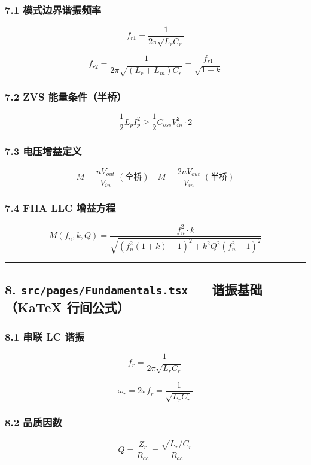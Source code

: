 \documentclass[UTF8]{ctexart}
\begin{document}
\subsubsection*{7.1 模式边界谐振频率}

\[
f_{r1} = \frac{1}{2\pi\sqrt{L_r C_r}}
\]

\[
f_{r2} = \frac{1}{2\pi\sqrt{(L_r + L_m) C_r}} = \frac{f_{r1}}{\sqrt{1 + k}}
\]

\subsubsection*{7.2 ZVS 能量条件（半桥）}

\[
\frac{1}{2} L_p I_p^2 \geq \frac{1}{2} C_{oss} V_{in}^2 \cdot 2
\]

\subsubsection*{7.3 电压增益定义}

\[
M = \frac{n V_{out}}{V_{in}} \;(\text{全桥}) \quad M = \frac{2n V_{out}}{V_{in}} \;(\text{半桥})
\]

\subsubsection*{7.4 FHA LLC 增益方程}

\[
M(f_n, k, Q) = \frac{f_n^2 \cdot k}{\sqrt{(f_n^2(1+k)-1)^2 + k^2 Q^2 (f_n^2-1)^2}}
\]

\noindent\rule{\textwidth}{0.4pt}

\subsection*{8. \texttt{src/pages/Fundamentals.tsx} — 谐振基础（KaTeX 行间公式）}

\subsubsection*{8.1 串联 LC 谐振}

\[
f_r = \frac{1}{2\pi\sqrt{L_r C_r}}
\]

\[
\omega_r = 2\pi f_r = \frac{1}{\sqrt{L_r C_r}}
\]

\subsubsection*{8.2 品质因数}

\[
Q = \frac{Z_r}{R_{ac}} = \frac{\sqrt{L_r/C_r}}{R_{ac}}
\]
\end{document}
